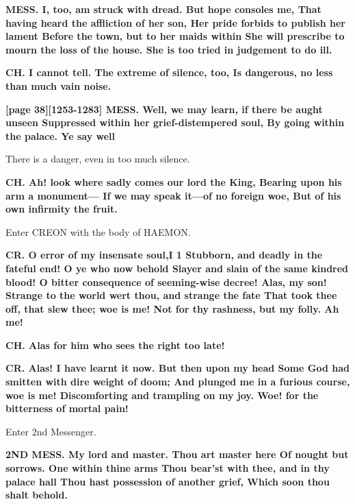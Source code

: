 \documentclass[11pt,letter]{book}
\begin{document}
\par \textbf{MESS. I, too, am struck with dread. But hope consoles me, That having heard the affliction of her son, Her pride forbids to publish her lament Before the town, but to her maids within She will prescribe to mourn the loss of the house. She is too tried in judgement to do ill.}
\par 

\par \textbf{CH. I cannot tell. The extreme of silence, too, Is dangerous, no less than much vain noise.}
\par 

\par \textbf{[page 38][1253-1283] MESS. Well, we may learn, if there be aught unseen Suppressed within her grief-distempered soul, By going within the palace. Ye say well}
\par   There is a danger, even in too much silence.

\par \textbf{CH. Ah! look where sadly comes our lord the King, Bearing upon his arm a monument— If we may speak it—of no foreign woe, But of his own infirmity the fruit.}
\par 

\par  Enter CREON with the body of HAEMON.

\par \textbf{CR. O error of my insensate soul,I 1 Stubborn, and deadly in the fateful end! O ye who now behold Slayer and slain of the same kindred blood! O bitter consequence of seeming-wise decree! Alas, my son! Strange to the world wert thou, and strange the fate That took thee off, that slew thee; woe is me! Not for thy rashness, but my folly. Ah me!}
\par 

\par \textbf{CH. Alas for him who sees the right too late!}
\par 

\par \textbf{CR. Alas! I have learnt it now. But then upon my head Some God had smitten with dire weight of doom; And plunged me in a furious course, woe is me! Discomforting and trampling on my joy. Woe! for the bitterness of mortal pain!}
\par 

\par  Enter 2nd Messenger.

\par \textbf{2ND MESS. My lord and master. Thou art master here Of nought but sorrows. One within thine arms Thou bear’st with thee, and in thy palace hall Thou hast possession of another grief, Which soon thou shalt behold.}
\par 
\end{document}
